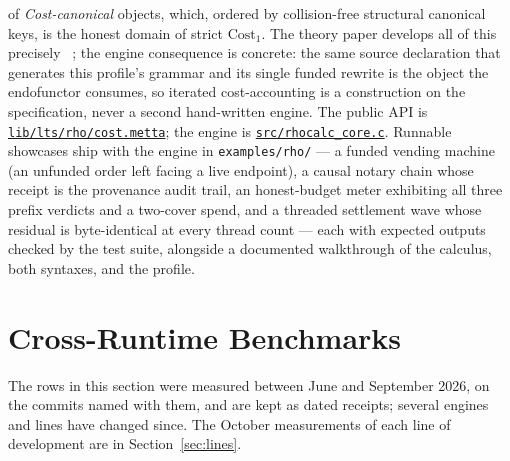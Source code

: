 \documentclass[11pt]{article}
\newcommand{\code}[1]{\texttt{#1}}
\begin{document}
of \emph{Cost-canonical} objects, which, ordered by collision-free
structural canonical keys, is the honest domain of strict
$\mathrm{Cost}_1$.  The theory paper develops all of this precisely
~\cite{rhocost-companion}; the engine consequence is concrete: the same
source declaration that generates this profile's grammar and its single
funded rewrite is the object the endofunctor consumes, so iterated
cost-accounting is a construction on the specification, never a second
hand-written engine.  The public API is
\href{https://github.com/zariuq/CeTTa/blob/e23de3043462d80e27f9c9009bd0f1b955ed140c/lib/lts/rho/cost.metta}{\code{lib/lts/rho/cost.metta}};
the engine is
\href{https://github.com/zariuq/CeTTa/blob/e23de3043462d80e27f9c9009bd0f1b955ed140c/src/rhocalc_core.c}{\code{src/rhocalc\_core.c}}.
Runnable showcases ship with the engine in \code{examples/rho/} --- a funded vending machine
(an unfunded order left facing a live endpoint), a causal notary chain whose receipt is the
provenance audit trail, an honest-budget meter exhibiting all three prefix verdicts and a
two-cover spend, and a threaded settlement wave whose residual is byte-identical at every
thread count --- each with expected outputs checked by the test suite, alongside a documented
walkthrough of the calculus, both syntaxes, and the profile.

\section{Cross-Runtime Benchmarks}
\label{sec:benchmark-programs}

The rows in this section were measured between June and September 2026, on
the commits named with them, and are kept as dated receipts; several engines
and lines have changed since.  The October measurements of each line of
development are in Section~\ref{sec:lines}.
\end{document}

